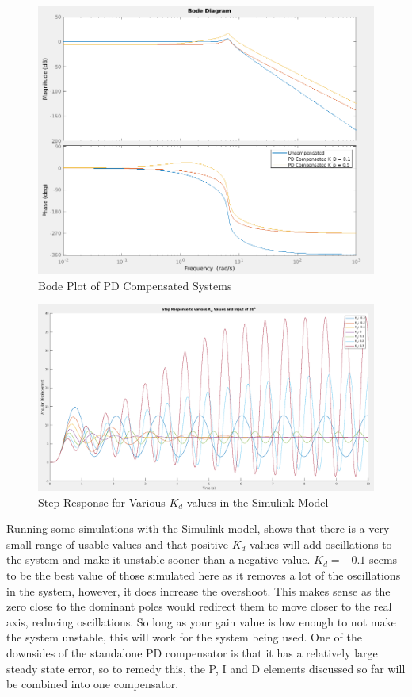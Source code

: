 \documentclass[a4paper, 11pt, compsoc]{IEEEtran}
\begin{document}
			\begin{figure}[!ht]
				\centering
				\includegraphics[width=\columnwidth]{lab6PDBode.png}
				\caption{Bode Plot of PD Compensated Systems}
				\label{fig:lab6PDBode}
			\end{figure}

			\begin{figure}[!ht]
				\centering
				\includegraphics[width=\columnwidth]{lab6PDStep.png}
				\caption{Step Response for Various $K_d$ values in the Simulink Model}
				\label{fig:lab6PDStep}
			\end{figure}

			Running some simulations with the Simulink model,  shows that there is a very small range of usable values and that positive $K_d$ values will add oscillations to the system and make it unstable sooner than a negative value. $K_d = -0.1$ seems to be the best value of those simulated here as it removes a lot of the oscillations in the system, however, it does increase the overshoot. This makes sense as the zero close to the dominant poles would redirect them to move closer to the real axis, reducing oscillations. So long as your gain value is low enough to not make the system unstable, this will work for the system being used. One of the downsides of the standalone PD compensator is that it has a relatively large steady state error, so to remedy this, the P, I and D elements discussed so far will be combined into one compensator. 
\end{document}
